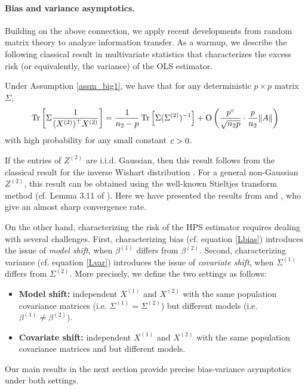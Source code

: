 \paragraph{Bias and variance asymptotics.}
Building on the above connection, we apply recent developments from random matrix theory to analyze information transfer.
As a warmup, we describe the following classical result in multivariate statistics that characterizes the excess risk (or equivalently, the variance) of the OLS estimator.

\begin{lemma}\label{fact_tr}
	Under Assumption \ref{assm_big1}, we have that for any deterministic $p\times p$ matrix $\Sigma$,
		\[ \bigtr{\Sigma \frac1{(X^{(2)})^\top X^{(2)} }  } %
		= \frac{1}{n_2 - p}\bigtr{\Sigma (\Sigma^{(2)})^{-1}} +  \OO\left( \frac{p^{\e}}{\sqrt{n_2 p}}\cdot \frac{p}{n_2}\|A\| \right) \]
		with high probability for any small constant ${\mathit{c}}>0$.
\end{lemma}
If the entries of $Z^{(2)}$ are i.i.d. Gaussian, then this result follows from the classical result for %
the inverse Wishart distribution \citet{anderson1958introduction}. For a general non-Gaussian $Z^{(2)}$, this result can be obtained using the well-known Stieltjes transform method (cf. Lemma 3.11 of \citet{bai2009spectral}). Here we have presented the results from \citet{isotropic} and \citet{DY}, who give an almost sharp convergence rate.

On the other hand, characterizing the risk of the HPS estimator requires dealing with several challenges.
First, characterizing bias (cf. equation \eqref{Lbias}) introduces the issue of \textit{model shift}, when $\beta^{(1)}$ differs from $\beta^{(2)}$.
Second, characterizing variance (cf. equation \eqref{Lvar}) introduces  the issue of \textit{covariate shift}, when $\Sigma^{(1)}$ differs from $\Sigma^{(2)}$.
More precisely, we define the two settings as follows:
\begin{itemize}
    \item \textbf{Model shift:} independent $X^{(1)}$ and $X^{(2)}$ with the same population covariance matrices (i.e. $\Sigma^{(1)}=\Sigma^{(2)}$) but different models (i.e. $\beta^{(1)} \neq \beta^{(2)}$).
    \item \textbf{Covariate shift:} independent $X^{(1)}$ and $X^{(2)}$ with the same population covariance matrices and but different models.
\end{itemize}
Our main results in the next section provide precise bias-variance asymptotics under both settings.

